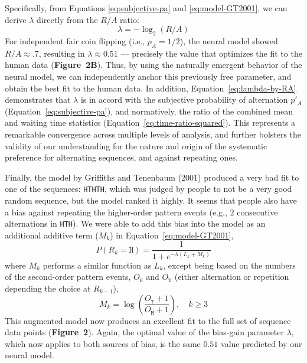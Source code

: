 \documentclass[11pt]{article}
\begin{document}
Specifically, from Equations \ref{eq:subjective-pa} and \ref{eq:model-GT2001}, we can derive $\lambda$ directly from the $R/A$ ratio:
\begin{equation}\label{eq:lambda-by-RA}
  \lambda = - \log_2(R/A)
\end{equation}
For independent fair coin flipping (i.e., $p_A=1/2$), the neural model showed $R/A \approx .7$, resulting in $\lambda \approx 0.51$ ---
precisely the value that optimizes the fit to the human data (\textbf{Figure~2B}).
Thus, by using the naturally emergent behavior of the neural model, we can independently anchor this previously free parameter, and obtain the best fit to the human data.
In addition, Equation~\ref{eq:lambda-by-RA} demonstrates that $\lambda$ is in accord with the subjective probability of alternation $p'_A$ (Equation~\ref{eq:subjective-pa}),
and normatively, the ratio of the combined mean and waiting time statistics (Equation~\ref{eq:time-ratio-squared}).
This represents a remarkable convergence across multiple levels of analysis, and further bolsters the validity of our understanding for the nature and origin of the systematic preference for alternating sequences, and against repeating ones.

Finally, the model by Griffiths and Tenenbaum (2001) produced a very bad fit to one of the sequences: \texttt{HTHTH}, which was judged by people to not be a very good random sequence, but the model ranked it highly.
It seems that people also have a bias against repeating the higher-order pattern events (e.g., $2$ consecutive alternations in \texttt{HTH}).
We were able to add this bias into the model as an additional additive term ($M_k$) in Equation~\ref{eq:model-GT2001},
\begin{equation}\label{eq:model-augmented}
  P(R_k = \mathtt{H}) = \frac{1}{1+e^{-\lambda (L_k + M_k)}}
\end{equation}
where $M_k$ performs a similar function as $L_k$, except being based on the numbers of the second-order pattern events, $O_{\mathtt{H}}$ and $O_{\mathtt{T}}$ (either alternation or repetition depending the choice at $R_{k-1}$),
\begin{equation}\label{eq:log-likelihood-M}
  M_k = \log \left(\frac{O_{\mathtt{T}} + 1}{O_{\mathtt{H}} + 1} \right), \quad k \geq 3
\end{equation}
This augmented model now produces an excellent fit to the full set of sequence data points (\textbf{Figure~2}).
Again, the optimal value of the bias-gain parameter $\lambda$, which now applies to both sources of bias, is the same $0.51$ value predicted by our neural model.
\end{document}
